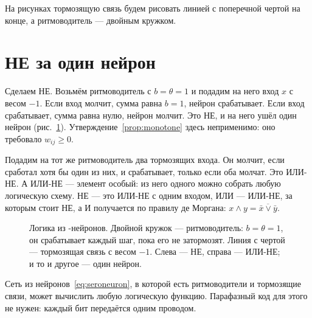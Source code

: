 На рисунках тормозящую связь будем рисовать линией с поперечной чертой на конце, а ритмоводитель --- двойным кружком.

\section{НЕ за один нейрон}

Сделаем НЕ. Возьмём ритмоводитель с $b=\theta=1$ и подадим на него вход $x$ с весом $-1$. Если вход молчит, сумма равна $b=1$, нейрон срабатывает. Если вход срабатывает, сумма равна нулю, нейрон молчит. Это НЕ, и на него ушёл один нейрон (рис.~\ref{fig:serogates}). Утверждение~\ref{prop:monotone} здесь неприменимо: оно требовало $w_{ij}\ge0$.

Подадим на тот же ритмоводитель два тормозящих входа. Он молчит, если сработал хотя бы один из них, и срабатывает, только если оба молчат. Это ИЛИ-НЕ. А ИЛИ-НЕ --- элемент особый: из него одного можно собрать любую логическую схему. НЕ --- это ИЛИ-НЕ с одним входом, ИЛИ --- ИЛИ-НЕ, за которым стоит НЕ, а И получается по правилу де Моргана: $x\wedge y=\overline{\bar x\vee\bar y}$.

\begin{figure}[t]
\centering
{}
\caption{Логика из -нейронов. Двойной кружок --- ритмоводитель: $b=\theta=1$, он срабатывает каждый шаг, пока его не затормозят. Линия с чертой --- тормозящая связь с весом $-1$. Слева --- НЕ, справа --- ИЛИ-НЕ; и то и другое --- один нейрон.}
\label{fig:serogates}
\end{figure}

\begin{keyblock}
\begin{proposition}
\label{prop:serocomplete}
Сеть из нейронов~\eqref{eq:seroneuron}, в которой есть ритмоводители и тормозящие связи, может вычислить любую логическую функцию. Парафазный код для этого не нужен: каждый бит передаётся одним проводом.
\end{proposition}
\end{keyblock}

